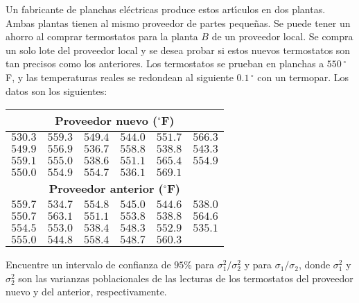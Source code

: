 \begin{enunciado}
 Un fabricante de planchas el\'ectricas produce estos art\'{\i}culos en dos plantas. Ambas plantas tienen al mismo proveedor de partes peque\~nas. Se puede tener un ahorro al comprar termostatos para la planta $B$ de un proveedor local. Se compra un solo lote del proveedor local y se desea probar si estos nuevos termostatos son tan precisos como los anteriores. Los termostatos se prueban en planchas a $550\,{}^{\circ}$F, y las temperaturas reales se redondean al siguiente $0.1\,{}^{\circ}$ con un termopar. Los datos son los siguientes:
 \begin{center}
  \begin{tabular}{cccccc}
   \multicolumn{6}{c}{\textbf{Proveedor nuevo (${}^{\circ}$F)}} \\
   \hline 
   $530.3$ & $559.3$ & $549.4$ & $544.0$ & $551.7$ & $566.3$ \\
   $549.9$ & $556.9$ & $536.7$ & $558.8$ & $538.8$ & $543.3$ \\
   $559.1$ & $555.0$ & $538.6$ & $551.1$ & $565.4$ & $554.9$ \\
   $550.0$ & $554.9$ & $554.7$ & $536.1$ & $569.1$ \\
   \multicolumn{6}{c}{\textbf{Proveedor anterior (${}^{\circ}$F)}} \\
   \hline 
   $559.7$ & $534.7$ & $554.8$ & $545.0$ & $544.6$ & $538.0$ \\
   $550.7$ & $563.1$ & $551.1$ & $553.8$ & $538.8$ & $564.6$ \\
   $554.5$ & $553.0$ & $538.4$ & $548.3$ & $552.9$ & $535.1$ \\
   $555.0$ & $544.8$ & $558.4$ & $548.7$ & $560.3$
  \end{tabular}
 \end{center}
 Encuentre un intervalo de confianza de $95\%$ para $\sigma_1^2/\sigma_2^2$ y para $\sigma_1/\sigma_2$, donde $\sigma_1^2$ y $\sigma_2^2$ son las varianzas poblacionales de las lecturas de los termostatos del proveedor nuevo y del anterior, respectivamente.
\end{enunciado}

